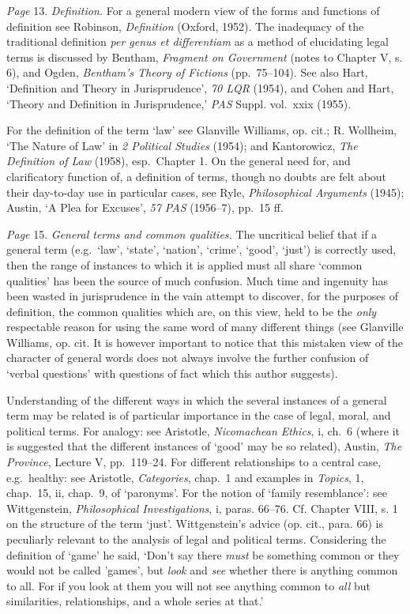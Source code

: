 \documentclass[12pt,oneside]{book}  %
\begin{document}
\emph{Page} 13. \emph{Definition.} For a general modern view of the
forms and functions of definition see Robinson, \emph{Definition}
(Oxford, 1952). The inadequacy of the traditional definition \emph{per
genus et differentiam} as a method of elucidating legal terms is
discussed by Bentham, \emph{Fragment on Government} (notes to Chapter V,
s. 6), and Ogden, \emph{Bentham's Theory of Fictions} (pp.~75--104). See
also Hart, `Definition and Theory in Jurisprudence', \emph{70 LQR}
(1954), and Cohen and Hart, `Theory and Definition in Jurisprudence,'
\emph{PAS} Suppl. vol.~xxix (1955).

For the definition of the term `law' see Glanville Williams, op. cit.;
R. Wollheim, `The Nature of Law' in \emph{2 Political Studies} (1954);
and Kantorowicz, \emph{The Definition of Law} (1958), esp.~Chapter 1. On
the general need for, and clarificatory function of, a definition of
terms, though no doubts are felt about their day-to-day use in
particular cases, see Ryle, \emph{Philosophical Arguments} (1945);
Austin, `A Plea for Excuses', \emph{57 PAS} (1956--7), pp.~15 ff.

\emph{Page} 15. \emph{General terms and common qualities.} The
uncritical belief that if a general term (e.g.~`law', `state', `nation',
`crime', `good', `just') is correctly used, then the range of instances
to which it is applied must all share `common qualities' has been the
source of much confusion. Much time and ingenuity has been wasted in
jurisprudence in the vain attempt to discover, for the purposes of
definition, the common qualities which are, on this view, held to be the
\emph{only} respectable reason for using the same word of many different
things (see Glanville Williams, op. cit. It is however important to
notice that this mistaken view of the character of general words does
not always involve the further confusion of `verbal questions' with
questions of fact which this author suggests).

Understanding of the different ways in which the several instances of a
general term may be related is of particular importance in the case of
legal, moral, and political terms. For analogy: see Aristotle,
\emph{Nicomachean Ethics}, i, ch.~6 (where it is suggested that the
different instances of `good' may be so related), Austin, \emph{The
Province}, Lecture V, pp.~119--24. For different relationships to a
central case, e.g.~healthy: see Aristotle, \emph{Categories}, chap.~1
and examples in \emph{Topics}, 1, chap.~15, ii, chap.~9, of `paronyms'.
For the notion of `family resemblance': see Wittgenstein,
\emph{Philosophical Investigations}, i, paras. 66--76. Cf. Chapter VIII,
s. 1 on the structure of the term `just'. Wittgenstein's advice (op.
cit., para. 66) is peculiarly relevant to the analysis of legal and
political terms. Considering the definition of `game' he said, `Don't
say there \emph{must} be something common or they would not be called
'games', but \emph{look} and \emph{see} whether there is anything common
to all. For if you look at them you will not see anything common to
\emph{all} but similarities, relationships, and a whole series at that.'
\end{document}
